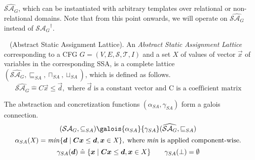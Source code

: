 $\widehat{\mathcal{SA}_{G}}$, which can be instantiated with arbitrary templates 
over relational or non-relational domains. Note that from this point onwards, we 
will operate on $\widehat{\mathcal{SA}_{G}}$ instead of ${\mathcal{SA}_{G}}^\dagger$. 
%
\begin{definition}~\label{assl} (Abstract Static Assignment Lattice). An \emph{Abstract Static 
Assignment Lattice} corresponding to a CFG $G= (V, E, \mathcal{S}, \mathcal{T}, I)$ 
and a set $X$ of values of vector $\vec{x}$ of variables in the 
corresponding SSA, is a complete lattice 
  $(\widehat{\mathcal{SA}_{G}}, \sqsubseteq_{SA}, \sqcap_{SA}, \sqcup_{SA})$, which 
is defined as follows. 
\[
  \widehat{\mathcal{SA}_{G}} \mathrel{\hat=} C\vec{x} \leq \vec{d},\; \text{where}\; 
  \vec{d}\;\text{is a constant vector and C is a coefficient matrix} 
\]
\end{definition}
%
The abstraction and concretization functions $(\alpha_{SA}, \gamma_{SA})$ form 
a galois connection.
%
\[
  (\mathcal{SA}_{G},\subseteq_{SA})
   \galois{\alpha_{SA}}{\gamma_{SA}}
   (\widehat{\mathcal{SA}_{G}},\sqsubseteq_{SA})
\]
%
\[
  \alpha_{SA}(\numconcval) = \min \{\vec{\numabsval}\mid
  \mat{C}\vec{\numvar}\leq\vec{\numabsval}, \vec{\numvar}\in
  \numconcval\},\;\text{where}\; \min\; \text{is applied component-wise}.  
\]  
%  
\[  
   \gamma_{SA}(\vec{\numabsval}) \mathrel{\hat=} \{\vec{\numvar}\mid
   \mat{C}\vec{\numvar}\leq\vec{\numabsval}, \vec{\numvar} \in X\} 
   \qquad \gamma_{SA}(\bot)=\emptyset
\]
%



